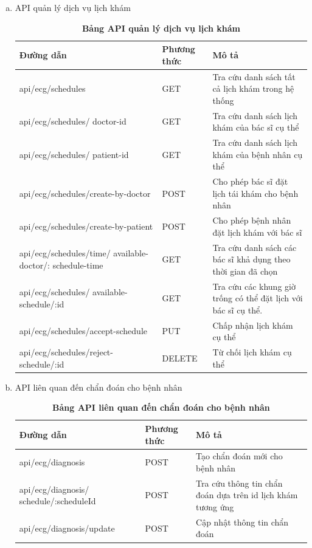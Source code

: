\begin{enumerate}[a)]
  
  \item API quản lý dịch vụ lịch khám
  \begin{xltabular}{\textwidth}{
	| >{\raggedright\arraybackslash}m{4.5cm}
	| >{\centering\arraybackslash}m{2.8cm}
	| >{\raggedright\arraybackslash}X |
	}
	\caption{\bfseries \fontsize{12pt}{0pt}\selectfont Bảng API quản lý dịch vụ lịch khám}
	\label{table_api_schedule}
	\\
	\hline
	\bfseries Đường dẫn    &\bfseries Phương thức    &\bfseries Mô tả\\ \hline
	api/ecg/schedules   &   GET  & Tra cứu danh sách tất cả lịch khám trong hệ thống \\ \hline
	api/ecg/schedules/ doctor-id  &    GET    & Tra cứu danh sách lịch khám của bác sĩ cụ thể \\ \hline
	api/ecg/schedules/ patient-id  &    GET    & Tra cứu danh sách lịch khám của bệnh nhân cụ thể \\ \hline
	api/ecg/schedules/create-by-doctor  &    POST    & Cho phép bác sĩ đặt lịch tái khám cho bệnh nhân \\ \hline
	api/ecg/schedules/create-by-patient  &    POST    & Cho phép bệnh nhân đặt lịch khám với bác sĩ \\ \hline
	api/ecg/schedules/time/ available-doctor/: schedule-time  &    GET    & Tra cứu danh sách các bác sĩ khả dụng theo thời gian đã chọn \\ \hline
	api/ecg/schedules/ available-schedule/:id  &    GET    & Tra cứu các khung giờ trống có thể đặt lịch với bác sĩ cụ thể. \\ \hline
	api/ecg/schedules/accept-schedule  &    PUT    & Chấp nhận lịch khám cụ thể \\ \hline
	api/ecg/schedules/reject-schedule/:id  &    DELETE    & Từ chối lịch khám cụ thể \\ \hline
	\end{xltabular}
  
  \item API liên quan đến chẩn đoán cho bệnh nhân
  \begin{xltabular}{\textwidth}{
	| >{\raggedright\arraybackslash}m{4.5cm}
	| >{\centering\arraybackslash}m{2.8cm}
	| >{\raggedright\arraybackslash}X |
	}
	\caption{\bfseries \fontsize{12pt}{0pt}\selectfont Bảng API liên quan đến chẩn đoán cho bệnh nhân}
	\label{table_api_diagnosis}
	\\
	\hline
	\bfseries Đường dẫn    &\bfseries Phương thức    &\bfseries Mô tả\\ \hline
	api/ecg/diagnosis   &   POST  & Tạo chẩn đoán mới cho bệnh nhân \\ \hline
	api/ecg/diagnosis/ schedule/:scheduleId   &   POST  & Tra cứu thông tin chẩn đoán dựa trên id lịch khám tương ứng\\ \hline
	api/ecg/diagnosis/update   &   POST  & Cập nhật thông tin chẩn đoán \\ \hline
	\end{xltabular}
  

\end{enumerate}
